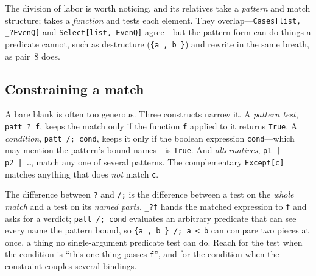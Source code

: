 The division of labor is worth noticing.  and its relatives take a
\emph{pattern} and match structure;  takes a \emph{function} and tests
each element. They overlap---\texttt{Cases[list, \_?EvenQ]} and
\texttt{Select[list, EvenQ]} agree---but the pattern form can do things a
predicate cannot, such as destructure (\texttt{\{a\_, b\_\}}) and rewrite in the
same breath, as pair~8 does.

\subsection{Constraining a match}
\label{ssec:prog-constrain}

A bare blank is often too generous. Three constructs narrow it. A
\emph{pattern test}, \texttt{patt\,?\,f}, keeps the match only if the function
\texttt{f} applied to it returns \texttt{True}. A \emph{condition},
\texttt{patt\,/;\,cond}, keeps it only if the boolean expression \texttt{cond}---which
may mention the pattern's bound names---is \texttt{True}. And
\emph{alternatives}, \texttt{p1\,|\,p2\,|\,\ldots}, match any one of several
patterns. The complementary \texttt{Except[c]} matches anything that does
\emph{not} match \texttt{c}.

\begin{codepairs}
\end{codepairs}

The difference between \texttt{?} and \texttt{/;} is the difference between a
test on the \emph{whole match} and a test on its \emph{named parts}.
\texttt{\_?f} hands the matched expression to \texttt{f} and asks for a verdict;
\texttt{patt /; cond} evaluates an arbitrary predicate that can see every name the
pattern bound, so \texttt{\{a\_, b\_\} /; a < b} can compare two pieces at once, a
thing no single-argument predicate test can do. Reach for the test when the
condition is ``this one thing passes \texttt{f}'', and for the condition when the
constraint couples several bindings.

